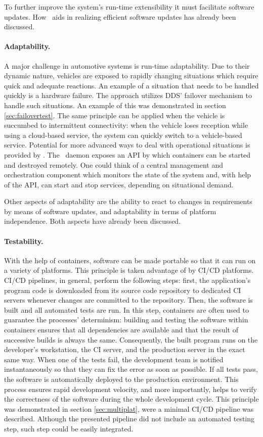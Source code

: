 To further improve the system's run-time extensibility it must facilitate software updates. How \docker\ aids in realizing efficient software updates has already been discussed.


\paragraph{Adaptability.}
A major challenge in automotive systems is run-time adaptability. Due to their dynamic nature, vehicles are exposed to rapidly changing situations which require quick and adequate reactions. An example of a situation that needs to be handled quickly is a hardware failure. The approach utilizes DDS' failover mechanism to handle such situations. An example of this was demonstrated in section \ref{sec:failovertest}. The same principle can be applied when the vehicle is succumbed to intermittent connectivity: when the vehicle loses reception while using a cloud-based service, the system can quickly switch to a vehicle-based service. Potential for more advanced ways to deal with operational situations is provided by \docker . The \docker\ daemon exposes an API by which containers can be started and destroyed remotely. One could think of a central management and orchestration component which monitors the state of the system and, with help of the API, can start and stop services, depending on situational demand. 

Other aspects of adaptability are the ability to react to changes in requirements by means of software updates, and adaptability in terms of platform independence. Both aspects have already been discussed.


\paragraph{Testability.}
With the help of containers, software can be made portable so that it can run on a variety of platforms. This principle is taken advantage of by CI/CD platforms. CI/CD pipelines, in general, perform the following steps: first, the application's program code is downloaded from its source code repository to dedicated CI servers whenever changes are committed to the repository. Then, the software is built and all automated tests are run. In this step, containers are often used to guarantee the processes' determinism: building and testing the software within containers ensures that all dependencies are available and that the result of successive builds is always the same. Consequently, the built program runs on the developer's workstation, the CI server, and the production server in the exact same way.
When one of the tests fail, the development team is notified instantaneously so that they can fix the error as soon as possible. If all tests pass, the software is automatically deployed to the production environment. This process ensures rapid development velocity, and more importantly, helps to verify the correctness of the software during the whole development cycle. This principle was demonstrated in section \ref{sec:multiplat}, were a minimal CI/CD pipeline was described. Although the presented pipeline did not include an automated testing step, such step could be easily integrated. 

